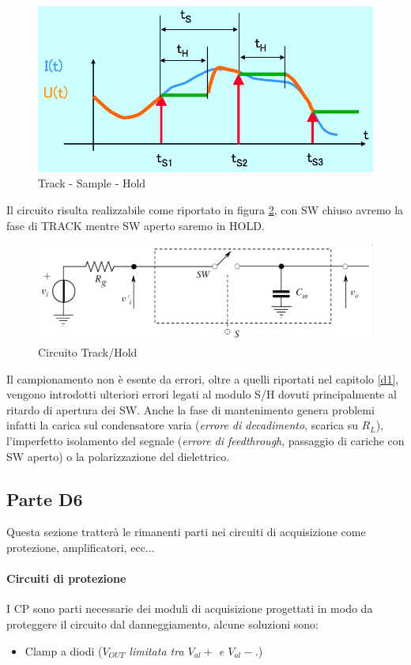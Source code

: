 \documentclass[12pt]{article}
\begin{document}
\begin{figure}[!hpt]
  \includegraphics[width=\textwidth]{images/tsh.png}
  \caption{Track - Sample - Hold}
  \label{fig:tsh}
\end{figure}

Il circuito risulta realizzabile come riportato in figura \ref{fig:th}, con SW chiuso avremo la fase di TRACK mentre SW aperto saremo in HOLD.

\begin{figure}[!hpt]
  \includegraphics[width=\textwidth]{images/th.png}
  \caption{Circuito Track/Hold}
  \label{fig:th}
\end{figure}

Il campionamento non è esente da errori, oltre a quelli riportati nel capitolo \ref{d1}, vengono introdotti ulteriori errori legati al modulo S/H dovuti principalmente al ritardo di apertura dei SW. Anche la fase di mantenimento genera problemi infatti la carica sul condensatore varia (\textit{errore di decadimento}, scarica su $R_{L}$), l'imperfetto isolamento del segnale (\textit{errore di feedthrough}, passaggio di cariche con SW aperto) o la polarizzazione del dielettrico.

\subsection{Parte D6}\label{d6}
Questa sezione tratterà le rimanenti parti nei circuiti di acquisizione come protezione, amplificatori, ecc...
\paragraph{Circuiti di protezione} I CP sono parti necessarie dei moduli di acquisizione progettati in modo da proteggere il circuito dal danneggiamento, alcune soluzioni sono:
\begin{itemize}
  \item Clamp a diodi (\textit{$V_{OUT}$ limitata tra $V_{al}+$ e $V_{al}-$.})
\end{itemize}
\end{document}
